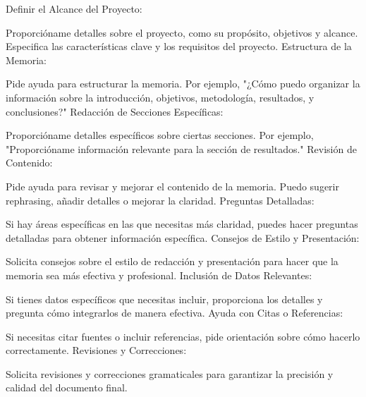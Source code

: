 Definir el Alcance del Proyecto:

Proporcióname detalles sobre el proyecto, como su propósito, objetivos y alcance.
Especifica las características clave y los requisitos del proyecto.
Estructura de la Memoria:

Pide ayuda para estructurar la memoria. Por ejemplo, "¿Cómo puedo organizar la información sobre la introducción, objetivos, metodología, resultados, y conclusiones?"
Redacción de Secciones Específicas:

Proporcióname detalles específicos sobre ciertas secciones. Por ejemplo, "Proporcióname información relevante para la sección de resultados."
Revisión de Contenido:

Pide ayuda para revisar y mejorar el contenido de la memoria. Puedo sugerir rephrasing, añadir detalles o mejorar la claridad.
Preguntas Detalladas:

Si hay áreas específicas en las que necesitas más claridad, puedes hacer preguntas detalladas para obtener información específica.
Consejos de Estilo y Presentación:

Solicita consejos sobre el estilo de redacción y presentación para hacer que la memoria sea más efectiva y profesional.
Inclusión de Datos Relevantes:

Si tienes datos específicos que necesitas incluir, proporciona los detalles y pregunta cómo integrarlos de manera efectiva.
Ayuda con Citas o Referencias:

Si necesitas citar fuentes o incluir referencias, pide orientación sobre cómo hacerlo correctamente.
Revisiones y Correcciones:

Solicita revisiones y correcciones gramaticales para garantizar la precisión y calidad del documento final.
